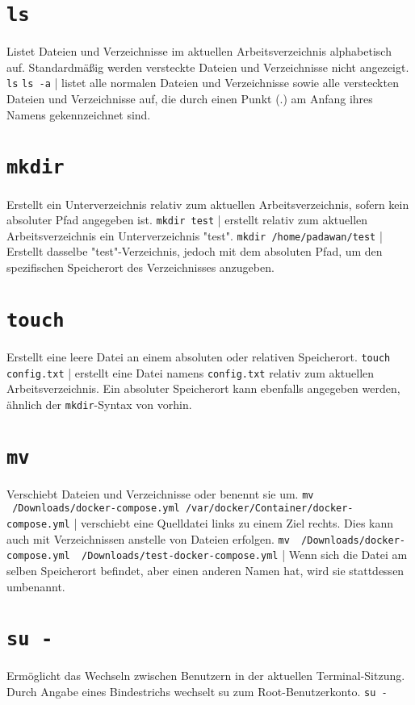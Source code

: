 \documentclass{article}
\newcommand{\doublebreak}{\break\break}
\begin{document}
    \newpage
	
	\section{\texttt{ls}}
	Listet Dateien und Verzeichnisse im aktuellen Arbeitsverzeichnis alphabetisch auf. Standardmäßig werden versteckte Dateien und Verzeichnisse nicht angezeigt.
	\doublebreak
	\texttt{ls}
	\doublebreak
	\texttt{ls -a} | listet alle normalen Dateien und Verzeichnisse sowie alle versteckten Dateien und Verzeichnisse auf, die durch einen Punkt (.) am Anfang ihres Namens gekennzeichnet sind.
	
	\section{\texttt{mkdir}}
	Erstellt ein Unterverzeichnis relativ zum aktuellen Arbeitsverzeichnis, sofern kein absoluter Pfad angegeben ist.
	\doublebreak
	\texttt{mkdir test} | erstellt relativ zum aktuellen Arbeitsverzeichnis ein Unterverzeichnis "test".
	\doublebreak
	\texttt{mkdir /home/padawan/test} | Erstellt dasselbe "test"-Verzeichnis, jedoch mit dem absoluten Pfad, um den spezifischen Speicherort des Verzeichnisses anzugeben.
	
	\section{\texttt{touch}}
	Erstellt eine leere Datei an einem absoluten oder relativen Speicherort.
	\doublebreak
	\texttt{touch config.txt} | erstellt eine Datei namens \texttt{config.txt} relativ zum aktuellen Arbeitsverzeichnis. Ein absoluter Speicherort kann ebenfalls angegeben werden, ähnlich der \texttt{mkdir}-Syntax von vorhin.
	
	\section{\texttt{mv}}
	Verschiebt Dateien und Verzeichnisse oder benennt sie um.
	\doublebreak
	\texttt{mv ~/Downloads/docker-compose.yml /var/docker/Container/docker-compose.yml} | verschiebt eine Quelldatei links zu einem Ziel rechts. Dies kann auch mit Verzeichnissen anstelle von Dateien erfolgen.
	\doublebreak
	\texttt{mv ~/Downloads/docker-compose.yml ~/Downloads/test-docker-compose.yml} | Wenn sich die Datei am selben Speicherort befindet, aber einen anderen Namen hat, wird sie stattdessen umbenannt.
	
	\section{\texttt{su -}}
	Ermöglicht das Wechseln zwischen Benutzern in der aktuellen Terminal-Sitzung. Durch Angabe eines Bindestrichs wechselt su zum Root-Benutzerkonto.
	\doublebreak
	\texttt{su -}
	
\end{document}

